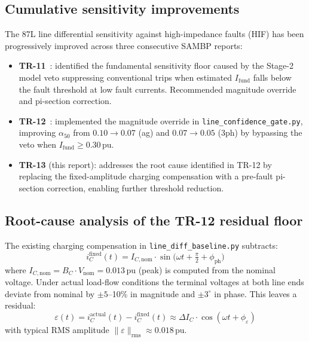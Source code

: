 \documentclass[11pt,a4paper]{article}
\newcommand{\Ifund}{I_{\mathrm{fund}}}
\newcommand{\alphafifty}{\alpha_{50}}
\newcommand{\BC}{B_C}
\newcommand{\eps}{\varepsilon}
\newcommand{\pu}{\,\text{pu}}
\begin{document}
\subsection{Cumulative sensitivity improvements}

The 87L line differential sensitivity against high-impedance faults (HIF) has
been progressively improved across three consecutive SAMBP reports:

\begin{itemize}
  \item \textbf{TR-11}~\cite{SAMBP_TR11}: identified the fundamental sensitivity
        floor caused by the Stage-2 model veto suppressing conventional trips
        when estimated $\Ifund$ falls below the fault threshold at low fault
        currents.  Recommended magnitude override and pi-section correction.
  \item \textbf{TR-12}~\cite{SAMBP_TR12}: implemented the magnitude override in
        \texttt{line\_confidence\_gate.py}, improving $\alphafifty$ from
        $0.10 \to 0.07$ (ag) and $0.07 \to 0.05$ (3ph) by bypassing the veto
        when $\Ifund \geq 0.30\pu$.
  \item \textbf{TR-13} (this report): addresses the root cause identified in
        TR-12 by replacing the fixed-amplitude charging compensation with a
        pre-fault pi-section correction, enabling further threshold reduction.
\end{itemize}

\subsection{Root-cause analysis of the TR-12 residual floor}

The existing charging compensation in \texttt{line\_diff\_baseline.py} subtracts:
\begin{equation}
  i_C^{\mathrm{fixed}}(t) = I_{C,\mathrm{nom}} \cdot \sin\!\bigl(\omega t + \tfrac{\pi}{2} + \phi_{\mathrm{ph}}\bigr)
  \label{eq:fixed_comp}
\end{equation}
where $I_{C,\mathrm{nom}} = \BC\cdot V_{\mathrm{nom}} = 0.013\pu$ (peak) is
computed from the nominal voltage.  Under actual load-flow conditions the
terminal voltages at both line ends deviate from nominal by $\pm 5$--10\% in
magnitude and $\pm 3^\circ$ in phase.  This leaves a residual:
\begin{equation}
  \eps(t) = i_C^{\mathrm{actual}}(t) - i_C^{\mathrm{fixed}}(t)
           \approx \Delta I_C \cdot \cos(\omega t + \phi_\eps)
  \label{eq:residual}
\end{equation}
with typical RMS amplitude $\|\eps\|_{\mathrm{rms}} \approx 0.018\pu$.
\end{document}
